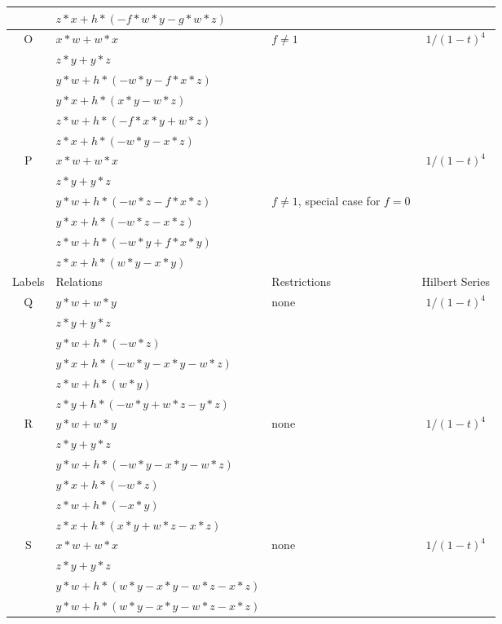\documentclass[12]{article}
\begin{document}
\begin{longtable}[c]{|c|p{5.75cm}|p{2.75cm}|c|}
   & $ z*x + h*(-f*w*y - g*w*z ) $ & &  \\  
\hline
 O & $ x*w + w*x $ &\multirow{6}{*}{$ f \neq 1 $} &\multirow{6}{*}{$ 1/(1-t)^4 $} \\ 
    & $ z*y + y*z $ & &  \\ 
   & $ y*w + h*(-w*y - f*x*z ) $ & & \\  
   & $ y*x + h*(x*y - w*z ) $ & & \\  
   & $  z*w + h*(-f*x*y + w*z ) $ & & \\ 
   & $ z*x + h*(-w*y - x*z ) $ & &  \\  
\hline
 P & $ x*w + w*x $ & &\multirow{6}{*}{$ 1/(1-t)^4 $} \\ 
    & $ z*y + y*z $ & &  \\ 
   & $ y*w + h*(-w*z - f*x*z ) $ & $ f\neq1 $, special case for $ f=0 $ & \\
   & $ y*x + h*(-w*z - x*z ) $ & & \\  
   & $  z*w + h*(-w*y + f*x*y ) $ & & \\ 
   & $ z*x + h*(w*y - x*y ) $ & &  \\  
\hline
\pagebreak
\midrule[1.0pt]
Labels & Relations & Restrictions & Hilbert Series \\
\hline
 Q & $ y*w + w*y $ &\multirow{6}{*}{none} &\multirow{6}{*}{$ 1/(1-t)^4 $} \\ 
    & $ z*y + y*z $ & &  \\ 
   & $ y*w + h*(-w*z) $ & & \\  
   & $ y*x + h*(-w*y - x*y - w*z ) $ & & \\  
   & $ z*w + h*(w*y ) $ & & \\ 
   & $ z*y + h*(-w*y + w*z - y*z ) $ & &  \\  
\hline
 R & $ y*w + w*y $ &\multirow{6}{*}{none} &\multirow{6}{*}{$ 1/(1-t)^4 $} \\ 
    & $ z*y + y*z $ & &  \\ 
   & $ y*w + h*(-w*y - x*y - w*z ) $ & & \\  
   & $  y*x + h*(-w*z ) $ & & \\  
   & $ z*w + h*(-x*y ) $ & & \\ 
   & $ z*x + h*(x*y + w*z - x*z ) $ & &  \\  
\hline
 S & $ x*w + w*x $ &\multirow{6}{*}{none} &\multirow{6}{*}{$ 1/(1-t)^4 $} \\ 
    & $ z*y + y*z $ & &  \\  
   & $ y*w + h*(w*y - x*y - w*z - x*z ) $ & & \\  
   & $ y*w + h*(w*y - x*y - w*z - x*z ) $ & & \\  

\end{longtable}
\end{document}
